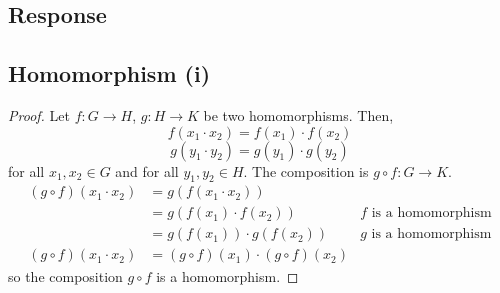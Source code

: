 \documentclass[13pt]{article}
\begin{document}
\subsection*{Response}
\subsection*{Homomorphism (i)}
\begin{proof}
    Let $f : G \to H$, $g: H \to K$ be two homomorphisms. Then,
    \[f(x_1 \cdot x_2) = f(x_1) \cdot f(x_2)\]
    \[g(y_1 \cdot y_2) = g(y_1) \cdot g(y_2)\]
    for all $x_1, x_2 \in G$ and for all $y_1, y_2 \in H$. The composition is $g \circ f : G \to K$.
    \begin{align*}
        (g \circ f)(x_1 \cdot x_2) &= g(f(x_1 \cdot x_2)) \\
                                  &= g(f(x_1) \cdot f(x_2)) & f \text{ is a homomorphism} \\
                                  &= g(f(x_1)) \cdot g(f(x_2)) & g \text{ is a homomorphism} \\
        (g \circ f)(x_1 \cdot x_2) &= (g \circ f)(x_1) \cdot (g \circ f)(x_2)
    \end{align*}
    so the composition $g \circ f$ is a homomorphism.
\end{proof}
\end{document}
